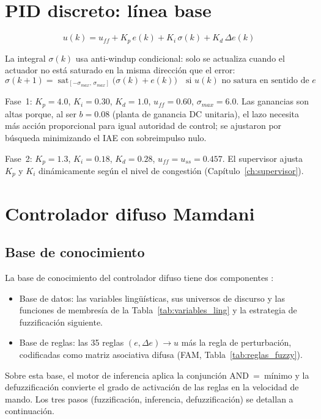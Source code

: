 \section{PID discreto: línea base}

\[
u(k) = u_{ff} + K_p\,e(k) + K_i\,\sigma(k) + K_d\,\Delta e(k)
\]

La integral $\sigma(k)$ usa anti-windup condicional: solo se actualiza cuando el actuador no está saturado en la misma dirección que el error:
\[
\sigma(k+1) = \operatorname{sat}_{[-\sigma_{max},\,\sigma_{max}]}\!\bigl(\sigma(k) + e(k)\bigr)
\quad\text{si }u(k)\text{ no satura en sentido de }e
\]

Fase~1: $K_p=4.0$, $K_i=0.30$, $K_d=1.0$, $u_{ff}=0.60$, $\sigma_{max}=6.0$. Las ganancias son altas porque, al ser $b=0.08$ (planta de ganancia DC unitaria), el lazo necesita más acción proporcional para igual autoridad de control; se ajustaron por búsqueda minimizando el IAE con sobreimpulso nulo.

Fase~2: $K_p=1.3$, $K_i=0.18$, $K_d=0.28$, $u_{ff}=u_{ss}=0.457$. El supervisor ajusta $K_p$ y $K_i$ dinámicamente según el nivel de congestión (Capítulo~\ref{ch:supervisor}).

\section{Controlador difuso Mamdani}

\subsection*{Base de conocimiento}

La base de conocimiento del controlador difuso tiene dos componentes \cite[cap.~5]{passino2005biomimicry}:
\begin{itemize}
  \item Base de datos: las variables lingüísticas, sus universos de discurso y las funciones de membresía de la Tabla~\ref{tab:variables_ling} y la estrategia de fuzzificación siguiente.
  \item Base de reglas: las 35 reglas $(e,\Delta e)\!\to\!u$ más la regla de perturbación, codificadas como matriz asociativa difusa (FAM, Tabla~\ref{tab:reglas_fuzzy}).
\end{itemize}
Sobre esta base, el motor de inferencia aplica la conjunción AND~=~mínimo y la defuzzificación convierte el grado de activación de las reglas en la velocidad de mando. Los tres pasos (fuzzificación, inferencia, defuzzificación) se detallan a continuación.

